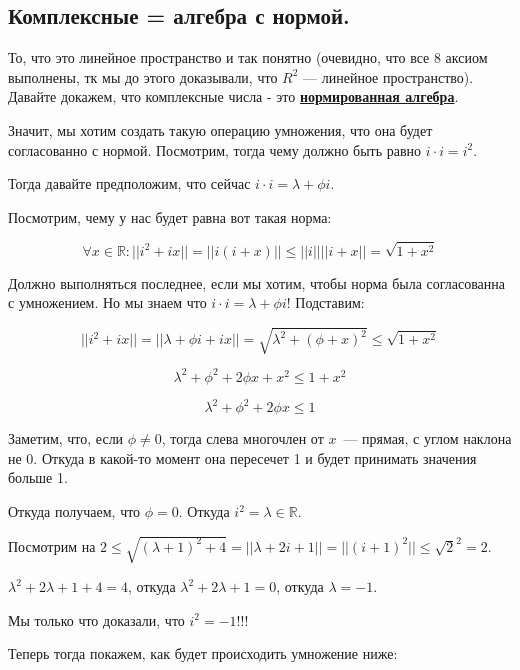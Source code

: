 \documentclass[twoside]{book}
\newcommand{\deff}[1]{\underline{\textbf{#1}}}
\begin{document}
\subsection{Комплексные = алгебра с нормой.}

То, что это линейное пространство и так понятно (очевидно, что все 8 аксиом выполнены, тк мы до этого доказывали, что \(R^2\) --- линейное пространство). Давайте докажем, что комплексные числа - это \deff{нормированная алгебра}.

Значит, мы хотим создать такую операцию умножения, что она будет согласованно с нормой. Посмотрим, тогда чему должно быть равно \(i\cdot i = i^2\).

Тогда давайте предположим, что сейчас \(i\cdot i = \lambda + \phi i\).

Посмотрим, чему у нас будет равна вот такая норма:

$$ \forall x \in \mathbb{R} : ||i^2 + ix|| = ||i (i + x)|| \leq ||i|| ||i + x|| = \sqrt{1 + x^2} $$

Должно выполняться последнее, если мы хотим, чтобы норма была согласованна с умножением. Но мы знаем что  \(i\cdot i = \lambda + \phi i\)! Подставим:

$$||i^2+ix|| = || \lambda + \phi i + ix|| = \sqrt{\lambda^2 + (\phi+x)^2} \leq \sqrt{1+x^2}$$

$$\lambda^2 + \phi^2+2\phi x+x^2 \leq 1+x^2$$

$$\lambda^2 + \phi^2+2\phi x \leq 1$$

Заметим, что, если \(\phi\neq 0\), тогда слева многочлен от \(x\)~--- прямая, с углом наклона не 0. Откуда в какой-то момент она пересечет 1 и будет принимать значения больше 1.

Откуда получаем, что \(\phi=0\). Откуда $i^2 = \lambda \in \mathbb{R}$.

Посмотрим на \(2 \leq \sqrt{(\lambda+1)^2+4}=||\lambda + 2i + 1||=||(i+1)^2||\leq \sqrt{2}^2 = 2\).

\(\lambda^2+2\lambda+1+4=4\), откуда  \(\lambda^2+2\lambda+1=0 \), откуда \(\lambda = -1\).

Мы  только что доказали, что \(i^2 =-1\)!!!

Теперь тогда покажем, как будет происходить умножение ниже:
\end{document}
